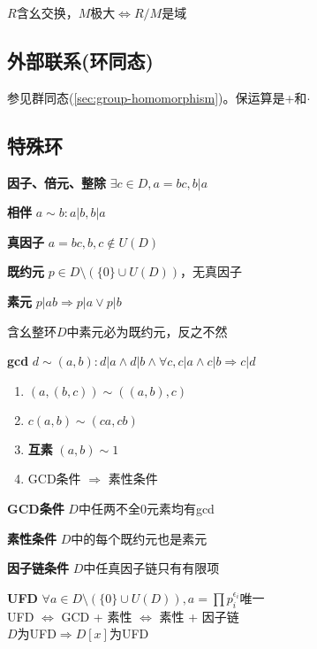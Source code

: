 \documentclass[b4paper, 10pt]{ctexart}
\newcommand*{\impl}{\Rightarrow}
\renewcommand*{\iff}{\Leftrightarrow}
\begin{document}
\begin{multicols}{3}
    $R$含幺交换，$M$极大$\iff R/M$是域

    \subsection{外部联系(环同态)}

    参见群同态(\ref{sec:group-homomorphism})。保运算是+和$\cdot$

    \subsection{特殊环}

    \textbf{因子、倍元、整除} $\exists c \in D, a = bc, b | a$

    \textbf{相伴} $a \sim b: a | b, b | a$

    \textbf{真因子} $a = bc, b, c \notin U(D)$

    \textbf{既约元} $p \in D \setminus (\{ 0 \} \cup U(D))$，无真因子

    \textbf{素元} $p | ab \impl p | a \vee p | b$

    含幺整环$D$中素元必为既约元，反之不然

    \textbf{gcd} $d \sim (a, b): d|a \wedge d|b \wedge \forall c, c|a \wedge c|b \impl c|d$

    \begin{theorem}[gcd性质]
        \hfil

        \begin{enumerate}
            \item $(a, (b, c)) \sim ((a, b), c)$
            \item $c(a, b) \sim (ca, cb)$
            \item \textbf{互素} $(a, b) \sim 1$
            \item GCD条件 $\impl$ 素性条件
        \end{enumerate}
    \end{theorem}

    \textbf{GCD条件} $D$中任两不全0元素均有gcd

    \textbf{素性条件} $D$中的每个既约元也是素元

    \textbf{因子链条件} $D$中任真因子链只有有限项

    \textbf{UFD} $\forall a \!\in\! D \setminus (\{ 0 \} \!\cup\! U(D)), a \! = \! \prod p_i^{\epsilon_i}$唯一\\
    UFD $\iff$ GCD + 素性 $\iff$ 素性 + 因子链 \\
    $D$为UFD$\impl D[x]$为UFD


\end{multicols}
\end{document}
